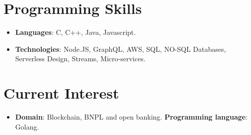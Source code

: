 \documentclass[letterpaper,11pt]{article}
\newcommand{\resumeItem}[2]{
  \item\small{
    \textbf{#1}{: #2 \vspace{-2pt}}
  }
}
\newcommand{\resumeSubItem}[2]{\resumeItem{#1}{#2}\vspace{-4pt}}
\newcommand{\resumeSubHeadingListStart}{\begin{itemize}[leftmargin=*]}
\newcommand{\resumeSubHeadingListEnd}{\end{itemize}}
\begin{document}
\section{Programming Skills}
  \resumeSubHeadingListStart
    \resumeSubItem{Languages}{C, C++, Java, Javascript.}
    \resumeSubItem{Technologies}{Node.JS, GraphQL, AWS, SQL, NO-SQL Databases, Serverless Design, Streams, Micro-services.}
  \resumeSubHeadingListEnd
  
\section{Current Interest}
  \resumeSubHeadingListStart
    \item{
      \textbf{Domain}{: Blockchain, BNPL and open banking.}
      \hfill
      \textbf{Programming language}{: Golang.}
    }
  \resumeSubHeadingListEnd


\end{document}
